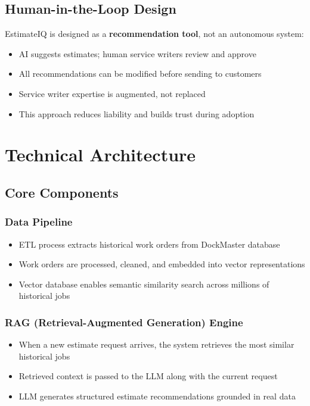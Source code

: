 \documentclass[11pt,a4paper]{article}
\begin{document}
\subsection{Human-in-the-Loop Design}

EstimateIQ is designed as a \textbf{recommendation tool}, not an autonomous system:

\begin{itemize}[leftmargin=*]
    \item AI suggests estimates; human service writers review and approve
    \item All recommendations can be modified before sending to customers
    \item Service writer expertise is augmented, not replaced
    \item This approach reduces liability and builds trust during adoption
\end{itemize}

\newpage
\section{Technical Architecture}

\subsection{Core Components}

\subsubsection{Data Pipeline}
\begin{itemize}[leftmargin=*]
    \item ETL process extracts historical work orders from DockMaster database
    \item Work orders are processed, cleaned, and embedded into vector representations
    \item Vector database enables semantic similarity search across millions of historical jobs
\end{itemize}

\subsubsection{RAG (Retrieval-Augmented Generation) Engine}
\begin{itemize}[leftmargin=*]
    \item When a new estimate request arrives, the system retrieves the most similar historical jobs
    \item Retrieved context is passed to the LLM along with the current request
    \item LLM generates structured estimate recommendations grounded in real data
\end{itemize}
\end{document}
